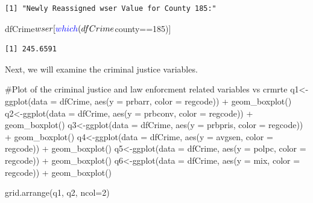 \documentclass[]{article}
\newenvironment{Shaded}{}{}
\newcommand{\CommentTok}[1]{\textcolor[rgb]{0.00,0.50,0.00}{#1}}
\newcommand{\DataTypeTok}[1]{#1}
\newcommand{\DecValTok}[1]{#1}
\newcommand{\KeywordTok}[1]{\textcolor[rgb]{0.00,0.00,1.00}{#1}}
\newcommand{\NormalTok}[1]{#1}
\newcommand{\OperatorTok}[1]{#1}
\newcommand{\StringTok}[1]{\textcolor[rgb]{0.00,0.50,0.50}{#1}}
\begin{document}
\begin{verbatim}
[1] "Newly Reassigned wser Value for County 185:"
\end{verbatim}

\begin{Shaded}
\begin{Highlighting}[]
\NormalTok{dfCrime}\OperatorTok{$}\NormalTok{wser[}\KeywordTok{which}\NormalTok{(dfCrime}\OperatorTok{$}\NormalTok{county}\OperatorTok{==}\DecValTok{185}\NormalTok{)]}
\end{Highlighting}
\end{Shaded}

\begin{verbatim}
[1] 245.6591
\end{verbatim}

Next, we will examine the criminal justice variables.

\begin{Shaded}
\begin{Highlighting}[]
\CommentTok{#Plot of the criminal justice and law enforcment related variables vs crmrte}
\NormalTok{q1<-}\KeywordTok{ggplot}\NormalTok{(}\DataTypeTok{data =}\NormalTok{ dfCrime, }\KeywordTok{aes}\NormalTok{(}\DataTypeTok{y =}\NormalTok{ prbarr, }\DataTypeTok{color =}\NormalTok{ regcode)) }\OperatorTok{+}\StringTok{ }
\StringTok{      }\KeywordTok{geom_boxplot}\NormalTok{()}
\NormalTok{q2<-}\KeywordTok{ggplot}\NormalTok{(}\DataTypeTok{data =}\NormalTok{ dfCrime, }\KeywordTok{aes}\NormalTok{(}\DataTypeTok{y =}\NormalTok{ prbconv, }\DataTypeTok{color =}\NormalTok{ regcode)) }\OperatorTok{+}\StringTok{ }
\StringTok{      }\KeywordTok{geom_boxplot}\NormalTok{()}
\NormalTok{q3<-}\KeywordTok{ggplot}\NormalTok{(}\DataTypeTok{data =}\NormalTok{ dfCrime, }\KeywordTok{aes}\NormalTok{(}\DataTypeTok{y =}\NormalTok{ prbpris, }\DataTypeTok{color =}\NormalTok{ regcode)) }\OperatorTok{+}\StringTok{ }
\StringTok{      }\KeywordTok{geom_boxplot}\NormalTok{()}
\NormalTok{q4<-}\KeywordTok{ggplot}\NormalTok{(}\DataTypeTok{data =}\NormalTok{ dfCrime, }\KeywordTok{aes}\NormalTok{(}\DataTypeTok{y =}\NormalTok{ avgsen, }\DataTypeTok{color =}\NormalTok{ regcode)) }\OperatorTok{+}\StringTok{ }
\StringTok{      }\KeywordTok{geom_boxplot}\NormalTok{()}
\NormalTok{q5<-}\KeywordTok{ggplot}\NormalTok{(}\DataTypeTok{data =}\NormalTok{ dfCrime, }\KeywordTok{aes}\NormalTok{(}\DataTypeTok{y =}\NormalTok{ polpc, }\DataTypeTok{color =}\NormalTok{ regcode)) }\OperatorTok{+}\StringTok{ }
\StringTok{      }\KeywordTok{geom_boxplot}\NormalTok{()}
\NormalTok{q6<-}\KeywordTok{ggplot}\NormalTok{(}\DataTypeTok{data =}\NormalTok{ dfCrime, }\KeywordTok{aes}\NormalTok{(}\DataTypeTok{y =}\NormalTok{ mix, }\DataTypeTok{color =}\NormalTok{ regcode)) }\OperatorTok{+}\StringTok{ }
\StringTok{      }\KeywordTok{geom_boxplot}\NormalTok{()}

\KeywordTok{grid.arrange}\NormalTok{(q1, q2, }\DataTypeTok{ncol=}\DecValTok{2}\NormalTok{)}
\end{Highlighting}
\end{Shaded}
\end{document}
